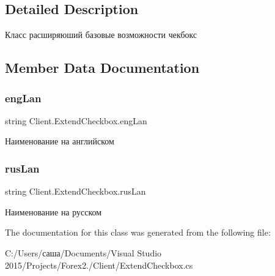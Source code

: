 \subsection{Detailed Description}
Класс расширяюший базовые возможности чекбокс 



\subsection{Member Data Documentation}
\hypertarget{class_client_1_1_extend_checkbox_ae2b4e37f89f3ead5c2f873d014f62cb7}{}\label{class_client_1_1_extend_checkbox_ae2b4e37f89f3ead5c2f873d014f62cb7} 
\subsubsection{\texorpdfstring{eng\+Lan}{engLan}}
{\footnotesize\ttfamily string Client.\+Extend\+Checkbox.\+eng\+Lan}



Наименование на английском 

\hypertarget{class_client_1_1_extend_checkbox_a89930618ff403ae6714aaf3b6983bf81}{}\label{class_client_1_1_extend_checkbox_a89930618ff403ae6714aaf3b6983bf81} 
\subsubsection{\texorpdfstring{rus\+Lan}{rusLan}}
{\footnotesize\ttfamily string Client.\+Extend\+Checkbox.\+rus\+Lan}



Наименование на русском 



The documentation for this class was generated from the following file\+:\begin{DoxyCompactItemize}
\item 
C\+:/\+Users/саша/\+Documents/\+Visual Studio 2015/\+Projects/\+Forex2./\+Client/Extend\+Checkbox.\+cs\end{DoxyCompactItemize}
